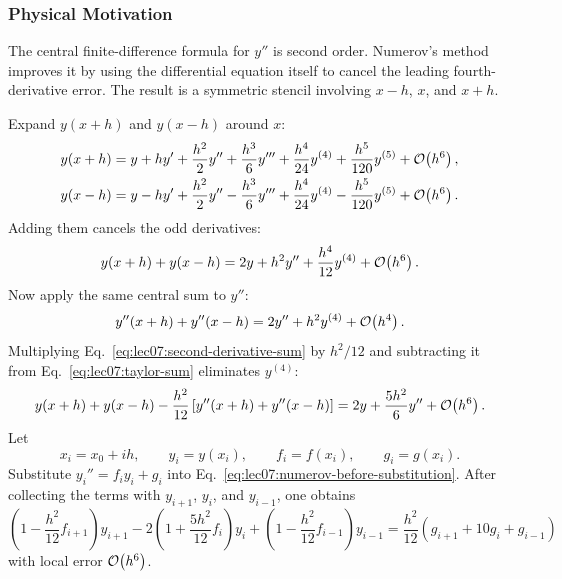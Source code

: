 \subsubsection*{Physical Motivation}
The central finite-difference formula for $y''$ is second order. Numerov's
method improves it by using the differential equation itself to cancel the
leading fourth-derivative error. The result is a symmetric stencil involving
$x-h$, $x$, and $x+h$.

Expand $y(x+h)$ and $y(x-h)$ around $x$:
\begin{align}
    y(x+h)
    &=y+h y'+\frac{h^2}{2}y''
      +\frac{h^3}{6}y'''
      +\frac{h^4}{24}y^{(4)}
      +\frac{h^5}{120}y^{(5)}
      +\mathcal{O}\!\left(h^6\right),
    \label{eq:lec07:taylor-plus}\\
    y(x-h)
    &=y-h y'+\frac{h^2}{2}y''
      -\frac{h^3}{6}y'''
      +\frac{h^4}{24}y^{(4)}
      -\frac{h^5}{120}y^{(5)}
      +\mathcal{O}\!\left(h^6\right).
    \label{eq:lec07:taylor-minus}
\end{align}
Adding them cancels the odd derivatives:
\begin{equation}
    y(x+h)+y(x-h)
    =2y+h^2y''+\frac{h^4}{12}y^{(4)}+\mathcal{O}\!\left(h^6\right).
    \label{eq:lec07:taylor-sum}
\end{equation}
Now apply the same central sum to $y''$:
\begin{equation}
    y''(x+h)+y''(x-h)
    =2y''+h^2y^{(4)}+\mathcal{O}\!\left(h^4\right).
    \label{eq:lec07:second-derivative-sum}
\end{equation}
Multiplying Eq.~\eqref{eq:lec07:second-derivative-sum} by $h^2/12$ and
subtracting it from Eq.~\eqref{eq:lec07:taylor-sum} eliminates
$y^{(4)}$:
\begin{equation}
    y(x+h)+y(x-h)
    -\frac{h^2}{12}\left[y''(x+h)+y''(x-h)\right]
    =2y+\frac{5h^2}{6}y''+\mathcal{O}\!\left(h^6\right).
    \label{eq:lec07:numerov-before-substitution}
\end{equation}
Let
\begin{equation}
    x_i=x_0+ih,
    \qquad
    y_i=y(x_i),
    \qquad
    f_i=f(x_i),
    \qquad
    g_i=g(x_i).
    \label{eq:lec07:grid-definitions}
\end{equation}
Substitute $y_i''=f_i y_i+g_i$ into
Eq.~\eqref{eq:lec07:numerov-before-substitution}. After collecting the
terms with $y_{i+1}$, $y_i$, and $y_{i-1}$, one obtains
\begin{equation}
    \boxed{
    \left(1-\frac{h^2}{12}f_{i+1}\right)y_{i+1}
    -2\left(1+\frac{5h^2}{12}f_i\right)y_i
    +\left(1-\frac{h^2}{12}f_{i-1}\right)y_{i-1}
    =
    \frac{h^2}{12}
    \left(g_{i+1}+10g_i+g_{i-1}\right)}
    \label{eq:lec07:numerov-formula}
\end{equation}
with local error $\mathcal{O}\!\left(h^6\right)$.

